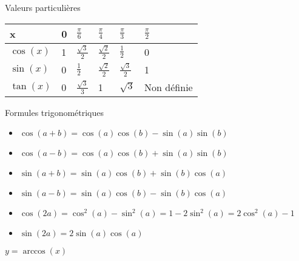 \documentclass[serif,mathserif, 10pt]{beamer}
\theoremstyle{break}
\begin{document}
\begin{frame}{Valeurs particulières}
  \begin{center}
    \renewcommand{\arraystretch}{3} %
    \begin{tabular}{|l|C{1cm}|C{1cm}|C{1cm}|C{1cm}|C{1cm}|}
      \hline
      x & 0 & $\frac{\pi}{6}$ & $\frac{\pi}{4}$ & $\frac{\pi}{3}$ & $\frac{\pi}{2}$\\
      \hline
      $\cos(x)$ & 1 & $\frac{\sqrt{3}}{2}$ & $\frac{\sqrt{2}}{2}$ & $\frac{1}{2}$ & 0\\
      \hline
      $\sin(x)$ & 0 & $\frac{1}{2}$ & $\frac{\sqrt{2}}{2}$ & $\frac{\sqrt{3}}{2}$ & 1\\
      \hline
      $\tan(x)$ & 0 & $\frac{\sqrt{3}}{3}$ & 1 & $\sqrt{3} $& Non définie\\
      \hline
    \end{tabular}
  \end{center}
\end{frame}

\begin{frame}{Formules trigonométriques}
  \begin{itemize}[label=$\bullet$]
  \item $\cos(a+b) = \cos(a) \cos(b) - \sin(a)\sin(b)$
  \item $\cos(a-b) = \cos(a) \cos(b) + \sin(a)\sin(b)$
  \item $\sin(a+b) = \sin(a) \cos(b) + \sin(b)\cos(a)$
  \item $\sin(a-b) = \sin(a) \cos(b) - \sin(b)\cos(a)$  
  \item $\cos(2a) = \cos^2(a) - \sin^2(a) = 1 - 2\sin^2(a) = 2\cos^2(a)-1$
  \item $\sin(2a) = 2\sin(a) \cos(a)$
  \end{itemize}
\end{frame}

\begin{frame}{$y=\arccos(x)$}
  \centering
\end{frame}
\end{document}
